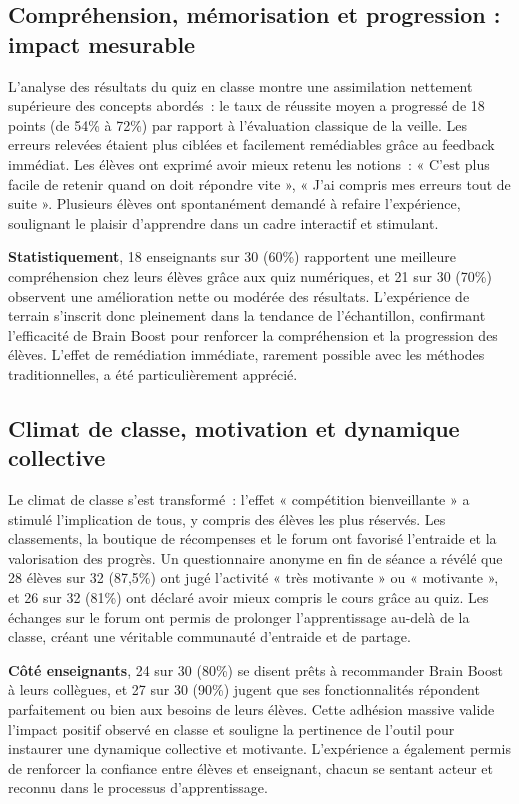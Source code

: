 \documentclass[a4paper,11pt]{report}
\begin{document}
\subsection{Compréhension, mémorisation et progression : impact mesurable}
L'analyse des résultats du quiz en classe montre une assimilation nettement supérieure des concepts abordés : le taux de réussite moyen a progressé de 18 points (de 54\% à 72\%) par rapport à l'évaluation classique de la veille. Les erreurs relevées étaient plus ciblées et facilement remédiables grâce au feedback immédiat. Les élèves ont exprimé avoir mieux retenu les notions : « C'est plus facile de retenir quand on doit répondre vite », « J'ai compris mes erreurs tout de suite ». Plusieurs élèves ont spontanément demandé à refaire l'expérience, soulignant le plaisir d'apprendre dans un cadre interactif et stimulant.

\textbf{Statistiquement}, 18 enseignants sur 30 (60\%) rapportent une meilleure compréhension chez leurs élèves grâce aux quiz numériques, et 21 sur 30 (70\%) observent une amélioration nette ou modérée des résultats. L'expérience de terrain s'inscrit donc pleinement dans la tendance de l'échantillon, confirmant l'efficacité de Brain Boost pour renforcer la compréhension et la progression des élèves. L'effet de remédiation immédiate, rarement possible avec les méthodes traditionnelles, a été particulièrement apprécié.

\subsection{Climat de classe, motivation et dynamique collective}
Le climat de classe s'est transformé : l'effet « compétition bienveillante » a stimulé l'implication de tous, y compris des élèves les plus réservés. Les classements, la boutique de récompenses et le forum ont favorisé l'entraide et la valorisation des progrès. Un questionnaire anonyme en fin de séance a révélé que 28 élèves sur 32 (87,5\%) ont jugé l'activité « très motivante » ou « motivante », et 26 sur 32 (81\%) ont déclaré avoir mieux compris le cours grâce au quiz. Les échanges sur le forum ont permis de prolonger l'apprentissage au-delà de la classe, créant une véritable communauté d'entraide et de partage.

\textbf{Côté enseignants}, 24 sur 30 (80\%) se disent prêts à recommander Brain Boost à leurs collègues, et 27 sur 30 (90\%) jugent que ses fonctionnalités répondent parfaitement ou bien aux besoins de leurs élèves. Cette adhésion massive valide l'impact positif observé en classe et souligne la pertinence de l'outil pour instaurer une dynamique collective et motivante. L'expérience a également permis de renforcer la confiance entre élèves et enseignant, chacun se sentant acteur et reconnu dans le processus d'apprentissage.
\end{document}

